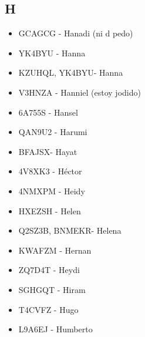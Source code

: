 \subsection*{H}
\begin{itemize}[leftmargin=*,nosep]
\item GCAGCG - Hanadi (ni d pedo)
\item YK4BYU - Hanna
\item KZUHQL, YK4BYU- Hanna
\item V3HNZA - Hanniel (estoy jodido)
\item 6A755S - Hansel
\item QAN9U2 - Harumi
\item BFAJSX- Hayat
\item 4V8XK3 - Héctor
\item 4NMXPM - Heidy
\item HXEZSH - Helen
\item Q2SZ3B, BNMEKR- Helena
\item KWAFZM - Hernan
\item ZQ7D4T - Heydi
\item SGHGQT - Hiram
\item T4CVFZ - Hugo
\item L9A6EJ - Humberto
\end{itemize}

